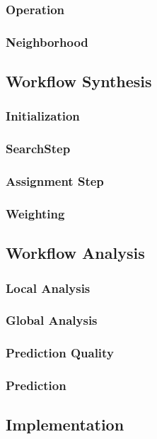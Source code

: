 \subsubsection{Operation}
\subsubsection{Neighborhood}

\subsection{Workflow Synthesis}
\subsubsection{Initialization}
\subsubsection{SearchStep}
\subsubsection{Assignment Step}
\subsubsection{Weighting}

\subsection{Workflow Analysis}
\subsubsection{Local Analysis}
\subsubsection{Global Analysis}
\subsubsection{Prediction Quality}
\subsubsection{Prediction}

\subsection{Implementation}

